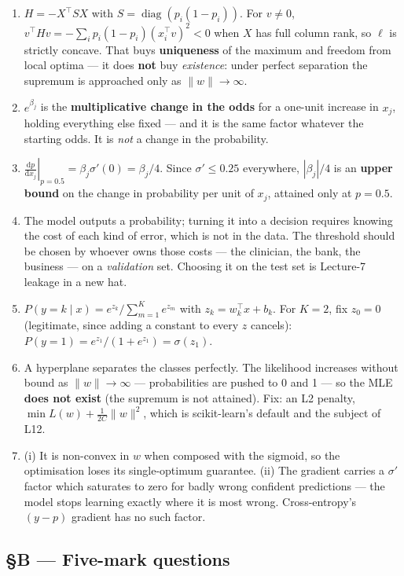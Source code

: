\documentclass[11pt,a4paper]{article}
\newcommand{\A}[1]{\item[\textbf{#1}]}
\begin{document}
\begin{enumerate}[leftmargin=1.9cm]
\A{U5.37} $H = -X^\top S X$ with $S = \operatorname{diag}(p_i(1-p_i))$. For
$v \ne 0$, $v^\top H v = -\sum_i p_i(1-p_i)(x_i^\top v)^2 < 0$ when $X$ has
full column rank, so $\ell$ is strictly concave. That buys \textbf{uniqueness}
of the maximum and freedom from local optima --- it does \textbf{not} buy
\emph{existence}: under perfect separation the supremum is approached only as
$\|w\| \to \infty$.

\A{U5.38} $e^{\beta_j}$ is the \textbf{multiplicative change in the odds} for a
one-unit increase in $x_j$, holding everything else fixed --- and it is the
same factor whatever the starting odds. It is \emph{not} a change in the
probability.

\A{U5.39} $\left.\frac{\mathrm dp}{\mathrm dx_j}\right|_{p=0.5} =
\beta_j\sigma'(0) = \beta_j/4$. Since $\sigma' \le 0.25$ everywhere, $|\beta_j|/4$
is an \textbf{upper bound} on the change in probability per unit of $x_j$,
attained only at $p = 0.5$.

\A{U5.40} The model outputs a probability; turning it into a decision requires
knowing the cost of each kind of error, which is not in the data. The
threshold should be chosen by whoever owns those costs --- the clinician, the
bank, the business --- on a \emph{validation} set. Choosing it on the test set
is Lecture-7 leakage in a new hat.

\A{U5.41} $P(y=k\mid x) = e^{z_k}/\sum_{m=1}^{K}e^{z_m}$ with
$z_k = w_k^\top x + b_k$. For $K = 2$, fix $z_0 = 0$ (legitimate, since adding
a constant to every $z$ cancels): $P(y=1) = e^{z_1}/(1 + e^{z_1}) =
\sigma(z_1)$.

\A{U5.42} A hyperplane separates the classes perfectly. The likelihood
increases without bound as $\|w\| \to \infty$ --- probabilities are pushed to
0 and 1 --- so the MLE \textbf{does not exist} (the supremum is not attained).
Fix: an L2 penalty, $\min L(w) + \frac{1}{2C}\|w\|^2$, which is
scikit-learn's default and the subject of L12.

\A{U5.43} (i) It is non-convex in $w$ when composed with the sigmoid, so the
optimisation loses its single-optimum guarantee. (ii) The gradient carries a
$\sigma'$ factor which saturates to zero for badly wrong confident
predictions --- the model stops learning exactly where it is most wrong.
Cross-entropy's $(y-p)$ gradient has no such factor.
\end{enumerate}

\subsection*{§B --- Five-mark questions}
\end{document}
